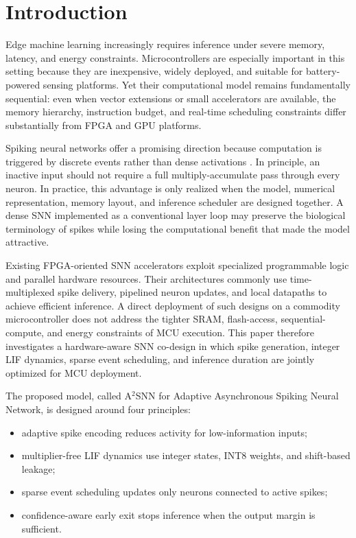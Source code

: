 \documentclass[journal]{IEEEtran}
\newcommand{\modelname}{A$^2$SNN}
\begin{document}
\section{Introduction}
Edge machine learning increasingly requires inference under severe memory, latency, and energy constraints. Microcontrollers are especially important in this setting because they are inexpensive, widely deployed, and suitable for battery-powered sensing platforms. Yet their computational model remains fundamentally sequential: even when vector extensions or small accelerators are available, the memory hierarchy, instruction budget, and real-time scheduling constraints differ substantially from FPGA and GPU platforms.

Spiking neural networks offer a promising direction because computation is triggered by discrete events rather than dense activations \cite{roy2019towards,pfeiffer2018deep}. In principle, an inactive input should not require a full multiply-accumulate pass through every neuron. In practice, this advantage is only realized when the model, numerical representation, memory layout, and inference scheduler are designed together. A dense SNN implemented as a conventional layer loop may preserve the biological terminology of spikes while losing the computational benefit that made the model attractive.

Existing FPGA-oriented SNN accelerators exploit specialized programmable logic and parallel hardware resources. Their architectures commonly use time-multiplexed spike delivery, pipelined neuron updates, and local datapaths to achieve efficient inference. A direct deployment of such designs on a commodity microcontroller does not address the tighter SRAM, flash-access, sequential-compute, and energy constraints of MCU execution. This paper therefore investigates a hardware-aware SNN co-design in which spike generation, integer LIF dynamics, sparse event scheduling, and inference duration are jointly optimized for MCU deployment.

The proposed model, called \modelname{} for Adaptive Asynchronous Spiking Neural Network, is designed around four principles:
\begin{itemize}
    \item adaptive spike encoding reduces activity for low-information inputs;
    \item multiplier-free LIF dynamics use integer states, INT8 weights, and shift-based leakage;
    \item sparse event scheduling updates only neurons connected to active spikes;
    \item confidence-aware early exit stops inference when the output margin is sufficient.
\end{itemize}
\end{document}
